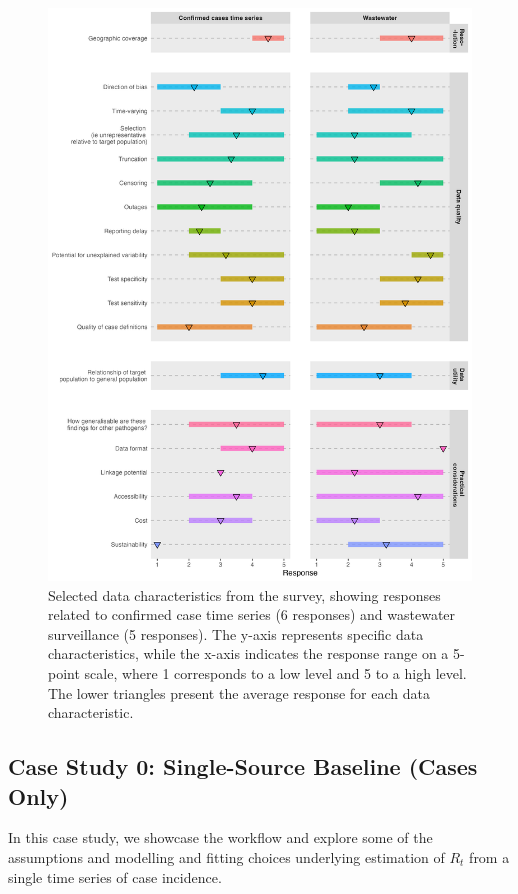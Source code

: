 \documentclass{article}
\begin{document}
%
\begin{figure}[H] 
\includegraphics[width=.97\linewidth]{figures/survey_responses.png}
\centering
\caption{ Selected data characteristics from the survey, showing responses related to confirmed case time series (6 responses) and wastewater surveillance (5 responses). The y-axis represents specific data characteristics, while the x-axis indicates the response range on a 5-point scale, where 1 corresponds to a low level and 5 to a high level. The lower triangles present the average response for each data characteristic.}
\label{survey_responses}
\end{figure}



\subsection{Case Study 0: Single-Source Baseline (Cases Only)}


In this case study, we showcase the workflow and explore some of the assumptions and modelling and fitting choices underlying estimation of $R_t$ from a single time series of case incidence.
\end{document}
